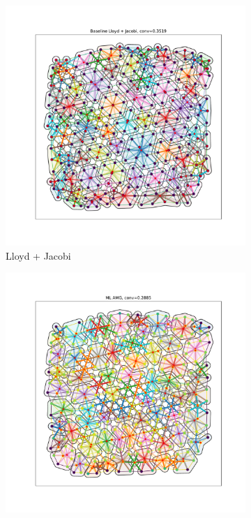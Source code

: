 \documentclass{article}
\begin{document}
\begin{figure}[h]
  \centering
  \begin{subfigure}[t]{0.32\textwidth}
    \centering
    \includegraphics[width=\textwidth, trim=80 70 70 50, clip]{grid_800_lloyd.pdf}
    \caption{Lloyd + Jacobi}
  \end{subfigure}
  \begin{subfigure}[t]{0.32\textwidth}
    \centering
    \includegraphics[width=\textwidth, trim=80 70 70 50, clip]{grid_800_ml.pdf}

\end{subfigure}
\end{figure}
\end{document}
